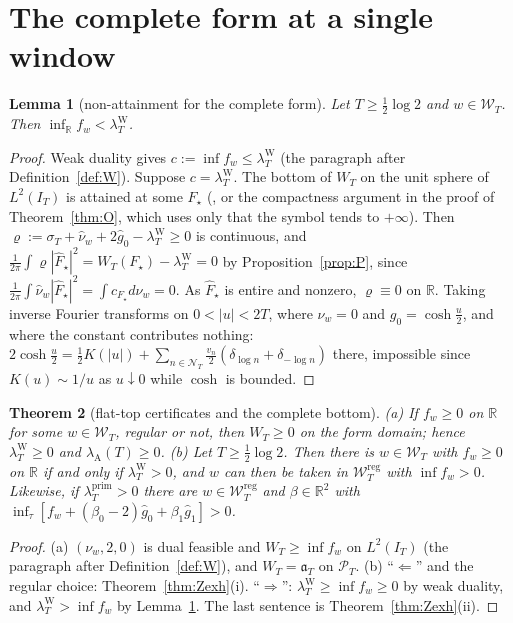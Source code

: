 \documentclass[11pt]{amsart}
\newtheorem{theorem}{Theorem}[section]
\newtheorem{lemma}[theorem]{Lemma}
\theoremstyle{definition}
\theoremstyle{remark}
\newcommand{\R}{\mathbb R}
\newcommand{\PT}{\mathcal P_T}
\newcommand{\IT}{I_T}
\newcommand{\lamP}{\lambda^{\mathrm{prim}}_T}
\newcommand{\lamW}{\lambda^{\mathrm W}_T}
\newcommand{\lamA}{\lambda_{\mathrm A}(T)}
\newcommand{\sT}{\sigma_T}
\newcommand{\gh}[1]{\widehat g_{#1}}
\newcommand{\nuh}{\widehat\nu}
\newcommand{\Fh}{\widehat F}
\newcommand{\Wcl}{\mathcal W_T}
\newcommand{\NT}{\mathcal N_T}
\begin{document}
\section{The complete form at a single window}\label{sec:complete}

\begin{lemma}[non-attainment for the complete form]\label{lem:Onat}
Let $T\ge\frac12\log2$ and $w\in\Wcl$. Then $\inf_\R f_w<\lamW$.
\end{lemma}
\begin{proof}
Weak duality gives $c:=\inf f_w\le\lamW$ (the paragraph after Definition~\ref{def:W}). Suppose $c=\lamW$. The
bottom of $W_T$ on the unit sphere of $L^2(\IT)$ is attained at some $F_\star$ (\cite[Thm.~3]{Bombieri2000},
or the compactness argument in the proof of Theorem~\ref{thm:O}, which uses only that the symbol tends to
$+\infty$). Then $\varrho:=\sT+\nuh_w+2\gh0-\lamW\ge0$ is continuous, and
$\frac1{2\pi}\int\varrho|\Fh_\star|^2=W_T(F_\star)-\lamW=0$ by Proposition~\ref{prop:P}, since
$\frac1{2\pi}\int\nuh_w|\Fh_\star|^2=\int c_{F_\star}d\nu_w=0$. As $\Fh_\star$ is entire and nonzero,
$\varrho\equiv0$ on $\R$. Taking inverse Fourier transforms on $0<|u|<2T$, where $\nu_w=0$ and $g_0=\cosh\frac u2$,
and where the constant contributes nothing: $2\cosh\frac u2=\frac12K(|u|)+\sum_{n\in\NT}\frac{v_n}2(\delta_{\log n}+\delta_{-\log n})$
there, impossible since $K(u)\sim1/u$ as $u\downarrow0$ while $\cosh$ is bounded.
\end{proof}

\begin{theorem}[flat-top certificates and the complete bottom]\label{thm:Al}
\emph{(a)} If $f_w\ge0$ on $\R$ for some $w\in\Wcl$, regular or not, then $W_T\ge0$ on the form domain;
hence $\lamW\ge0$ and $\lamA\ge0$.
\emph{(b)} Let $T\ge\frac12\log2$. Then there is $w\in\Wcl$ with $f_w\ge0$ on $\R$ if and only if
$\lamW>0$, and $w$ can then be taken in $\Wcl^{\mathrm{reg}}$ with $\inf f_w>0$. Likewise, if $\lamP>0$
there are $w\in\Wcl^{\mathrm{reg}}$ and $\beta\in\R^2$ with $\inf_\tau[f_w+(\beta_0-2)\gh0+\beta_1\gh1]>0$.
\end{theorem}
\begin{proof}
(a) $(\nu_w,2,0)$ is dual feasible and $W_T\ge\inf f_w$ on $L^2(\IT)$ (the paragraph after
Definition~\ref{def:W}), and $W_T=\mathfrak a_T$ on $\PT$. (b) ``$\Leftarrow$'' and the regular choice:
Theorem~\ref{thm:Zexh}(i). ``$\Rightarrow$'': $\lamW\ge\inf f_w\ge0$ by weak duality, and $\lamW>\inf f_w$ by
Lemma~\ref{lem:Onat}. The last sentence is Theorem~\ref{thm:Zexh}(ii).
\end{proof}
\end{document}
